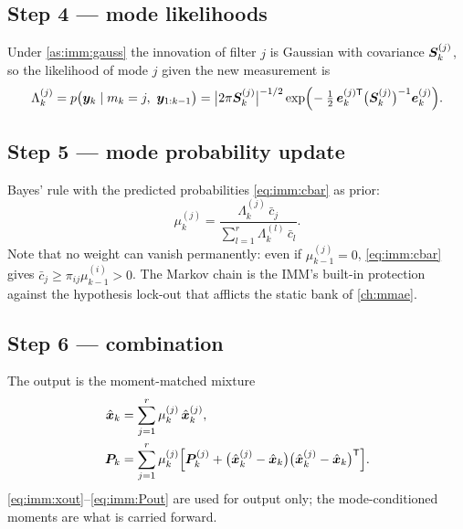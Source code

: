\subsection{Step 4 --- mode likelihoods}
Under \cref{as:imm:gauss} the innovation of filter $j$ is Gaussian with covariance $\bm{S}^{(j)}_k$, so
the likelihood of mode $j$ given the new measurement is
\begin{equation}
\Lambda^{(j)}_k = p\big(\vy_k\mid m_k=j,\ \vy_{1:k-1}\big)
= \big|2\pi\mS^{(j)}_k\big|^{-1/2}\exp\!\Big(\!-\tfrac12\,\bm{e}^{(j)\T}_k\big(\mS^{(j)}_k\big)\inv\bm{e}^{(j)}_k\Big).
\label{eq:imm:lik}
\end{equation}

\subsection{Step 5 --- mode probability update}
Bayes' rule with the predicted probabilities \eqref{eq:imm:cbar} as prior:
\begin{equation}
\mu^{(j)}_k = \frac{\Lambda^{(j)}_k\,\bar c_j}{\sum_{l=1}^{r}\Lambda^{(l)}_k\,\bar c_l}.
\label{eq:imm:mu}
\end{equation}
Note that no weight can vanish permanently: even if $\mu^{(j)}_{k-1}=0$, \eqref{eq:imm:cbar} gives
$\bar c_j\ge \pi_{ij}\mu^{(i)}_{k-1}>0$.  The Markov chain is the IMM's built-in protection against
the hypothesis lock-out that afflicts the static bank of \cref{ch:mmae}.

\subsection{Step 6 --- combination}
The output is the moment-matched mixture
\begin{align}
\hat{\bm{x}}_k &= \sum_{j=1}^{r}\mu^{(j)}_k\,\hat{\bm{x}}^{(j)}_k, \label{eq:imm:xout}\\
\bm{P}_k &= \sum_{j=1}^{r}\mu^{(j)}_k\Big[\bm{P}^{(j)}_k + \big(\hat{\bm{x}}^{(j)}_k-\hat{\bm{x}}_k\big)\big(\hat{\bm{x}}^{(j)}_k-\hat{\bm{x}}_k\big)^{\mathsf{T}}\Big].
\label{eq:imm:Pout}
\end{align}
\eqref{eq:imm:xout}--\eqref{eq:imm:Pout} are used for output only; the mode-conditioned moments are
what is carried forward.

